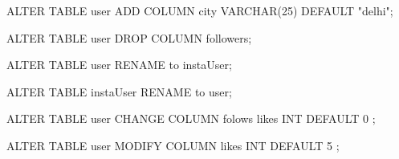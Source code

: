 ALTER TABLE user
ADD COLUMN city VARCHAR(25) DEFAULT "delhi";

ALTER TABLE user
DROP COLUMN followers;

ALTER TABLE user
RENAME to instaUser;

ALTER TABLE instaUser
RENAME to user;

ALTER TABLE user
CHANGE  COLUMN  folows likes INT DEFAULT 0 ;

ALTER TABLE user
MODIFY  COLUMN  likes INT DEFAULT 5 ;
